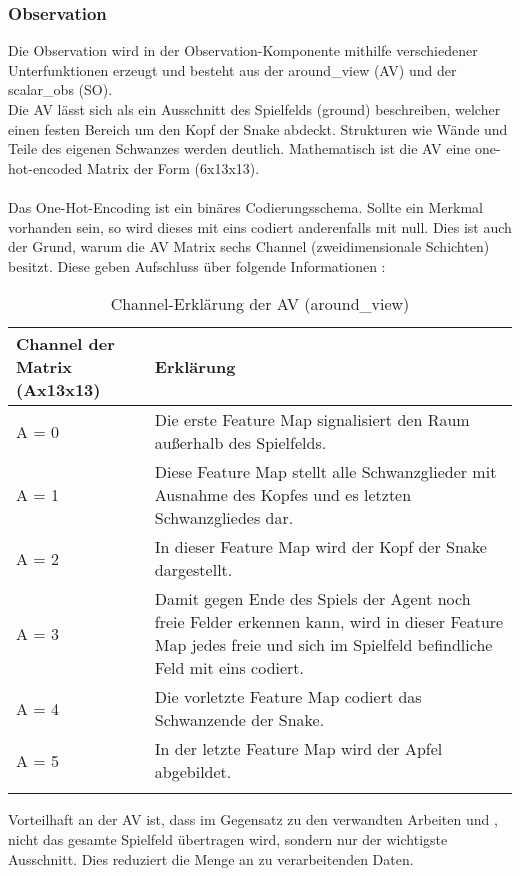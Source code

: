 \subsubsection{Observation} \label{subsubsec:Konzept_Observation}
Die Observation wird in der Observation-Komponente mithilfe verschiedener Unterfunktionen erzeugt und besteht aus der around\_view (AV) und der scalar\_obs (SO).\\
Die AV lässt sich als ein Ausschnitt des Spielfelds (ground) beschreiben, welcher einen festen Bereich um den Kopf der Snake abdeckt.
Strukturen wie Wände und Teile des eigenen Schwanzes werden deutlich. Mathematisch ist die AV eine one-hot-encoded Matrix der Form (6x13x13).\\
\\Das One-Hot-Encoding ist ein binäres Codierungsschema. Sollte ein Merkmal vorhanden sein, so wird dieses mit eins codiert anderenfalls mit null. \cite[S. 359 f.]{DRL_Lapan}
Dies ist auch der Grund, warum die AV Matrix sechs Channel (zweidimensionale Schichten) besitzt. Diese geben Aufschluss über folgende Informationen :
\begin{longtable}[h]{|p{4cm}|p{\linewidth - 5cm}|}
	\hline
	Channel der Matrix (Ax13x13) & Erklärung \\
	\hline
	A = 0 & Die erste Feature Map signalisiert den Raum außerhalb des Spielfelds.\\
	\hline
	A = 1 & Diese Feature Map stellt alle Schwanzglieder mit Ausnahme des Kopfes und es letzten Schwanzgliedes dar. \\
	\hline
	A = 2 & In dieser Feature Map wird der Kopf der Snake dargestellt. \\
	\hline
	A = 3 & Damit gegen Ende des Spiels der Agent noch freie Felder erkennen kann, wird in dieser Feature Map jedes freie und sich im Spielfeld befindliche Feld mit eins codiert. \\
	\hline
	A = 4 & Die vorletzte Feature Map codiert das Schwanzende der Snake. \\
	\hline
	A = 5 & In der letzte Feature Map wird der Apfel abgebildet. \\
	\hline
	\caption[Around\_View -- Erklärung der Channels]{Channel-Erklärung der AV (around\_view)}
	\label{tab:Konzept_around_view} 
\end{longtable}
Vorteilhaft an der AV ist, dass im Gegensatz zu den verwandten Arbeiten \citep{Autonomous_Agents_in_Snake_Game_via_DRL} und \citep{UAV}, nicht das gesamte Spielfeld übertragen wird, sondern nur der wichtigste Ausschnitt. Dies reduziert die Menge an zu verarbeitenden Daten.
